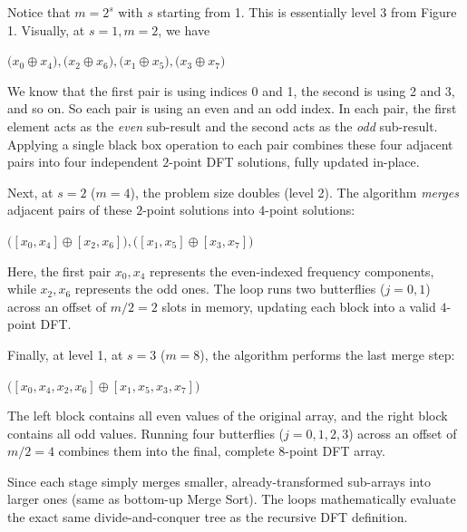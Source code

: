 \documentclass{article}
\begin{document}
Notice that $m=2^s$ with $s$ starting from 1. This is essentially level 3 from Figure 1. Visually, at $s=1, m = 2$, we have 
\begin{center}
$\Big( x_0 \oplus x_4 \Big), \Big( x_2 \oplus x_6 \Big), \Big( x_1 \oplus x_5 \Big), \Big( x_3 \oplus x_7 \Big)$
\end{center}
We know that the first pair is using indices 0 and 1, the second is using 2 and 3, and so on. So each pair is using an even and an odd index. In each pair, the first element acts as the \emph{even} sub-result and the second acts as the \emph{odd} sub-result. Applying a single black box operation to each pair combines these four adjacent pairs into four independent $2$-point DFT solutions, fully updated in-place.

Next, at $s = 2$ ($m = 4$), the problem size doubles (level 2). The algorithm \emph{merges} adjacent pairs of these $2$-point solutions into $4$-point solutions:
\begin{center}$\Big( [x_0, x_4] \oplus [x_2, x_6] \Big), \Big( [x_1, x_5] \oplus [x_3, x_7] \Big)$\end{center}

Here, the first pair $x_0, x_4$ represents the even-indexed frequency components, while $x_2, x_6$ represents the odd ones. The loop runs two butterflies ($j = 0, 1$) across an offset of $m/2 = 2$ slots in memory, updating each block into a valid $4$-point DFT.

Finally, at level 1, at $s = 3$ ($m = 8$), the algorithm performs the last merge step:\begin{center}$\Big( [x_0, x_4, x_2, x_6] \oplus [x_1, x_5, x_3, x_7] \Big)$\end{center}The left block contains all even values of the original array, and the right block contains all odd values. Running four butterflies ($j = 0, 1, 2, 3$) across an offset of $m/2 = 4$ combines them into the final, complete $8$-point DFT array.

Since each stage simply merges smaller, already-transformed sub-arrays into larger ones (same as bottom-up Merge Sort). The loops mathematically evaluate the exact same divide-and-conquer tree as the recursive DFT definition.
\end{document}
